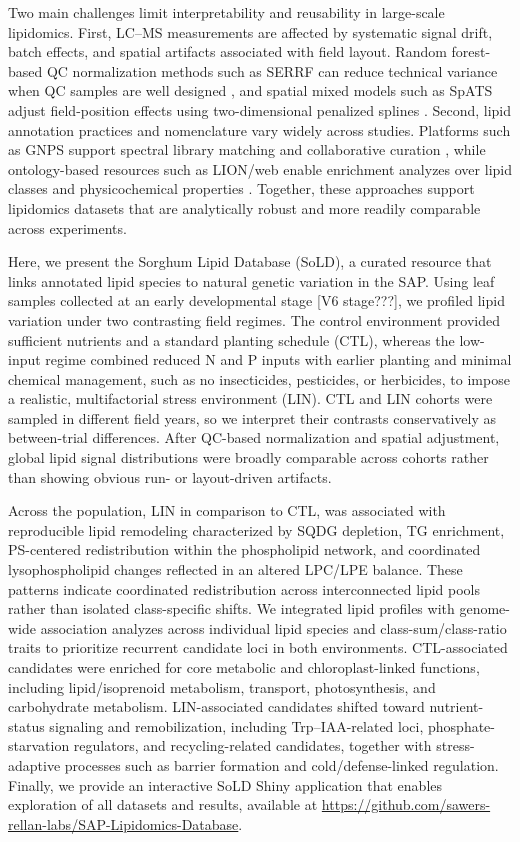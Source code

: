 \documentclass[9pt,twocolumn,twoside]{rilabRxiv}
\begin{document}
Two main challenges limit interpretability and reusability in large-scale lipidomics. First, LC--MS measurements are affected by systematic signal drift, batch effects, and spatial artifacts associated with field layout. Random forest-based QC normalization methods such as SERRF can reduce technical variance when QC samples are well designed \citep{Fan2019}, and spatial mixed models such as SpATS adjust field-position effects using two-dimensional penalized splines \citep{RodriguezAlvarez2018}. Second, lipid annotation practices and nomenclature vary widely across studies. Platforms such as GNPS support spectral library matching and collaborative curation \citep{Wang2016}, while ontology-based resources such as LION/web enable enrichment analyzes over lipid classes and physicochemical properties \citep{Molenaar2019}. Together, these approaches support lipidomics datasets that are analytically robust and more readily comparable across experiments.

Here, we present the Sorghum Lipid Database (SoLD), a curated resource that links annotated lipid species to natural genetic variation in the SAP. Using leaf samples collected at an early developmental stage [V6 stage???], we profiled lipid variation under two contrasting field regimes. The control environment provided sufficient nutrients and a standard planting schedule (CTL), whereas the low-input regime combined reduced N and P inputs with earlier planting and minimal chemical management, such as no insecticides, pesticides, or herbicides, to impose a realistic, multifactorial stress environment (LIN). CTL and LIN cohorts were sampled in different field years, so we interpret their contrasts conservatively as between-trial differences. After QC-based normalization and spatial adjustment, global lipid signal distributions were broadly comparable across cohorts rather than showing obvious run- or layout-driven artifacts.

Across the population, LIN in comparison to CTL, was associated with reproducible lipid remodeling characterized by SQDG depletion, TG enrichment, PS-centered redistribution within the phospholipid network, and coordinated lysophospholipid changes reflected in an altered LPC/LPE balance. These patterns indicate coordinated redistribution across interconnected lipid pools rather than isolated class-specific shifts. We integrated lipid profiles with genome-wide association analyzes across individual lipid species and class-sum/class-ratio traits to prioritize recurrent candidate loci in both environments. CTL-associated candidates were enriched for core metabolic and chloroplast-linked functions, including lipid/isoprenoid metabolism, transport, photosynthesis, and carbohydrate metabolism. LIN-associated candidates shifted toward nutrient-status signaling and remobilization, including Trp--IAA-related loci, phosphate-starvation regulators, and recycling-related candidates, together with stress-adaptive processes such as barrier formation and cold/defense-linked regulation. Finally, we provide an interactive SoLD Shiny application that enables exploration of all datasets and results, available at \url{https://github.com/sawers-rellan-labs/SAP-Lipidomics-Database}. 
\end{document}
